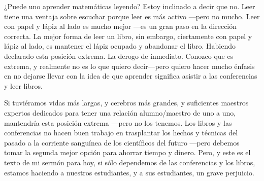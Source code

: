 \documentclass[12pt]{article}
\begin{document}
    ¿Puede uno aprender matemáticas leyendo?
    Estoy inclinado a decir que no.
    Leer tiene una ventaja sobre escuchar porque leer es más activo —pero no mucho.
    Leer con papel y lápiz al lado es mucho mejor —es un gran paso en la dirección correcta.
    La mejor forma de leer un libro, sin embargo, ciertamente con papel y
    lápiz al lado, es mantener el lápiz ocupado y abandonar el libro.
    Habiendo declarado esta posición extrema.
    La derogo de inmediato.
    Conozco que es extrema, y realmente no es lo que quiero decir—pero quiero hacer
    mucho énfasis en no dejarse llevar con la idea de que aprender significa asistir a las conferencias y leer libros.

    Si tuviéramos vidas más largas, y cerebros más grandes, y suficientes maestros expertos dedicados para tener
    una relación alumno/maestro de uno a uno, mantendría esta posición extrema —pero no los tenemos.
    Los libros y las conferencias no hacen buen trabajo en trasplantar los hechos y técnicas del pasado a la corriente
    sanguínea de los científicos del futuro —pero debemos tomar la segunda mejor opción para ahorrar tiempo y dinero.
    Pero, y este es el texto de mi sermón para hoy, si sólo dependemos de las conferencias y los libros, estamos
    haciendo a nuestros estudiantes, y a sus estudiantes, un grave perjuicio.
\end{document}
